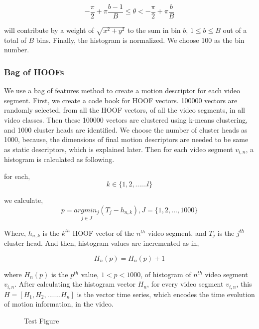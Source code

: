 \begin{equation}
- \frac{\pi}{2} + \pi\frac{b-1}{B} \leq \theta < -\frac{\pi}{2} + \pi\frac{b}{B}
\end{equation}

will contribute by a weight of $\sqrt{x^2 + y^2}$ to the sum in bin $b$, $1 \leq b \leq B$ out of a total of
$B$ bins. Finally, the histogram is normalized. We choose 100 as the bin number.

\subsubsection{Bag of HOOFs}
We use a bag of features method to create a motion descriptor for each video segment. First, we create a code book for HOOF vectors. 
100000 vectors are randomly selected, from all the HOOF vectors, of all the video segments, in all video classes. 
Then these 100000 vectors are clustered using k-means clustering, and 1000 cluster heads
are identified. We choose the number of cluster heads as 1000, because, the dimensions of final motion descriptors are needed to be same as
static descriptors, which is explained later. Then for each video segment $v_{i,n}$, a histogram is calculated as following. 

for each, 
\begin{equation}
k \in \big\{1,2,......l\big\}
\end{equation}

we calculate,
\begin{equation}
p = \underset{j\in J}{argmin_{j}}(T_{j}-h_{n,k}), J=\{1,2,...,1000\}
\end{equation}

Where, $h_{n,k}$ is the $k^{th}$ HOOF vector of the $n^{th}$ video segment, and $T_{j}$ is the $j^{th}$ cluster head. And then,
histogram values are incremented as in,

\begin{equation}
H_{n}(p) = H_{n}(p)+1
\end{equation}

where $H_{n}(p)$ is the $p^{th}$ value, $1<p<1000$, of histogram of $n^{th}$ video segment $v_{i,n}$. After calculating the histogram vector $H_{n}$, for every video segment $v_{i,n}$, 
this $H = [H_{1},H_{2},.......H_{n}]$ is the vector time series, which encodes the time evolution of motion information, in the video.

\begin{figure}
  \centering
  
  \caption{Test Figure}\label{fi:hoof}
\end{figure}


